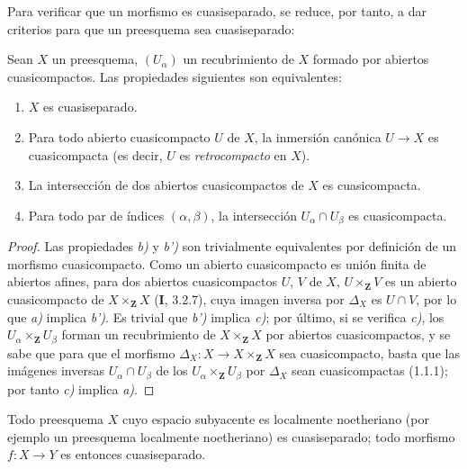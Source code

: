 
Para verificar que un morfismo es cuasiseparado, se reduce, por tanto, a dar
criterios para que un preesquema sea cuasiseparado:

\begin{proposition}[1.2.7]
\label{IV.1.2.7-fr}
Sean $X$ un preesquema, $(U_\alpha)$ un recubrimiento de $X$ formado por abiertos
cuasicompactos. Las propiedades siguientes son equivalentes:
\begin{enumerate}
  \item[\textup{a)}] $X$ es cuasiseparado.
  \item[\textup{b)}] Para todo abierto cuasicompacto $U$ de $X$, la inmersión canónica
  $U\to X$ es cuasicompacta \textup{(es decir, $U$ es \emph{retrocompacto} en $X$)}.
  \item[\textup{b')}] La intersección de dos abiertos cuasicompactos de $X$ es
  cuasicompacta.
  \item[\textup{c)}] Para todo par de índices $(\alpha,\beta)$, la intersección
  $U_\alpha\cap U_\beta$ es cuasicompacta.
\end{enumerate}
\end{proposition}

\begin{proof}
Las propiedades \emph{b)} y \emph{b')} son trivialmente equivalentes por
definición de un morfismo cuasicompacto. Como un abierto cuasicompacto es
unión finita de abiertos afines, para dos abiertos cuasicompactos $U$, $V$ de
$X$, $U\times_{\mathbf Z}V$ es un abierto cuasicompacto de
$X\times_{\mathbf Z}X$ (\textbf{I}, 3.2.7), cuya imagen inversa por $\Delta_X$ es
$U\cap V$, por lo que \emph{a)} implica \emph{b')}. Es trivial que \emph{b')}
implica \emph{c)}; por último, si se verifica \emph{c)}, los
$U_\alpha\times_{\mathbf Z}U_\beta$ forman un recubrimiento de
$X\times_{\mathbf Z}X$ por abiertos cuasicompactos, y se sabe que para
que el morfismo $\Delta_X:X\to X\times_{\mathbf Z}X$ sea cuasicompacto,
basta que las imágenes inversas $U_\alpha\cap U_\beta$ de los
$U_\alpha\times_{\mathbf Z}U_\beta$ por $\Delta_X$ sean cuasicompactas
(1.1.1); por tanto \emph{c)} implica \emph{a)}.
\end{proof}

\begin{corollary}[1.2.8]
\label{IV.1.2.8-fr}
Todo preesquema $X$ cuyo espacio subyacente es localmente noetheriano (por
ejemplo un preesquema localmente noetheriano) es cuasiseparado; todo morfismo
$f:X\to Y$ es entonces cuasiseparado.
\end{corollary}


